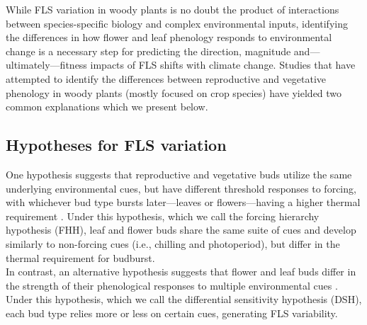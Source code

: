 \documentclass[12pt]{article}\usepackage[]{graphicx}\usepackage[]{color}
\begin{document}
\noindent While FLS variation in woody plants is no doubt the product of interactions between species-specific biology and complex environmental inputs, identifying the differences in how flower and leaf phenology responds to environmental change is a necessary step for predicting the direction, magnitude and---ultimately---fitness impacts of FLS shifts with climate change. Studies that have attempted to identify the differences between reproductive and vegetative phenology in woody plants (mostly focused on crop species) have yielded two common explanations which we present below.

\subsection*{Hypotheses for FLS variation}

\noindent One hypothesis suggests that reproductive and vegetative buds utilize the same underlying environmental cues, but have different threshold responses to forcing, with whichever bud type bursts later---leaves or flowers---having a higher thermal requirement \citep[that is, they need a greater sum of warm temperature to trigger the phenological event,][]{Guo2014,COSMULESCU:2020aa,Cosmulescu:2018aa}. Under this hypothesis, which we call the forcing hierarchy hypothesis (FHH), leaf and flower buds share the same suite of cues and develop similarly to non-forcing cues (i.e., chilling and photoperiod), but differ in the thermal requirement for budburst.\\

\noindent In contrast, an alternative hypothesis suggests that flower and leaf buds differ in the strength of their phenological responses to multiple environmental cues \citep{Citadin2001,Gariglio2006,Aslani2009,Mehlenbacher:1991aa}. Under this hypothesis, which we call the differential sensitivity hypothesis (DSH), each bud type relies more or less on certain cues, generating FLS variability.\\ %
\end{document}
